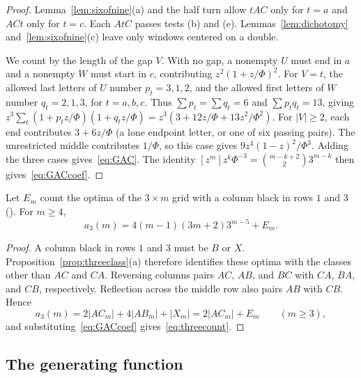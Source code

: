 \begin{proof}
Lemma~\ref{lem:sixofnine}(a) and the half turn allow $tAC$ only for
$t=a$ and $ACt$ only for $t=c$. Each $AtC$ passes tests (b) and (e).
Lemmas~\ref{lem:dichotomy} and~\ref{lem:sixofnine}(c) leave only
windows centered on a double.

We count by the length of the gap $V$. With no gap, a nonempty $U$ must end in
$a$ and a nonempty $W$ must start in $c$, contributing $z^2(1+z/\Phi)^2$.
For $V=t$, the allowed last letters of $U$ number $p_t=3,1,2$, and the
allowed first letters of $W$ number $q_t=2,1,3$, for $t=a,b,c$.
Thus $\sum p_t=\sum q_t=6$ and $\sum p_tq_t=13$, giving
$z^3\sum_t(1+p_tz/\Phi)(1+q_tz/\Phi)=z^3(3+12z/\Phi+13z^2/\Phi^2)$.
For $|V|\ge2$, each end contributes $3+6z/\Phi$ (a lone endpoint letter,
or one of six passing pairs). The unrestricted middle contributes
$1/\Phi$, so this case gives $9z^4(1-z)^2/\Phi^3$.
Adding the three cases gives~\eqref{eq:GAC}. The identity
$[z^m]z^k\Phi^{-3}=\binom{m-k+2}23^{m-k}$ then gives~\eqref{eq:GACcoef}.
\end{proof}

\begin{theorem}\label{thm:threecount}
Let $E_m$ count the optima of the $3\times m$ grid with a column black in rows $1$ and $3$
(). For $m\ge4$,
\begin{equation}\label{eq:threecount}
a_3(m)=4(m-1)(3m+2)3^{m-5}+E_m.
\end{equation}
\end{theorem}

\begin{proof}
A column black in rows $1$ and $3$ must be $B$ or $X$.
Proposition~\ref{prop:threeclass}(a) therefore identifies these optima
with the classes other than $AC$ and $CA$. Reversing columns pairs
$AC$, $AB$, and $BC$ with $CA$, $BA$, and $CB$, respectively.
Reflection across the middle row also pairs $AB$ with $CB$. Hence
\begin{equation}\label{eq:classsum}
a_3(m)=2|AC_m|+4|AB_m|+|X_m|=2|AC_m|+E_m\qquad(m\ge3),
\end{equation}
and substituting~\eqref{eq:GACcoef} gives~\eqref{eq:threecount}.
\end{proof}

\subsection{The generating function}

